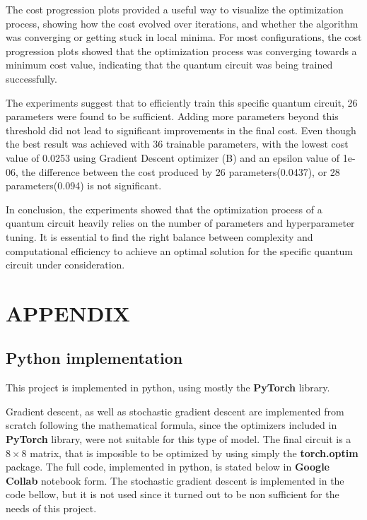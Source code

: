 \documentclass[inscr,ack,preface]{diphdthesis}
\begin{document}
The cost progression plots provided a useful way to visualize the optimization process, showing how the cost evolved over iterations, and whether the algorithm was converging or getting stuck in local minima. For most configurations, the cost progression plots showed that the optimization process was converging towards a minimum cost value, indicating that the quantum circuit was being trained successfully.

The experiments suggest that to efficiently train this specific quantum circuit, 26 parameters were found to be sufficient. Adding more parameters beyond this threshold did not lead to significant improvements in the final cost. Even though the best result was achieved with 36 trainable parameters, with the lowest cost value of 0.0253 using Gradient Descent optimizer (B) and an epsilon value of 1e-06, the difference between the cost produced by 26 parameters(0.0437), or 28 parameters(0.094) is not significant.

In conclusion, the experiments showed that the optimization process of a quantum circuit heavily relies on the number of parameters and hyperparameter tuning. It is essential to find the right balance between complexity and computational efficiency to achieve an optimal solution for the specific quantum circuit under consideration.

\chapter{APPENDIX}
\section{Python implementation}

This project is implemented in python, using mostly the \textbf{PyTorch} library. 

Gradient descent, as well as stochastic gradient descent are implemented from scratch following the mathematical formula, since the optimizers included in \textbf{PyTorch} library, were not suitable for this type of model. The final circuit is a $8\times8$ matrix, that is imposible to be optimized by using simply the \textbf{torch.optim} package. The full code, implemented in python, is stated below in \textbf{Google Collab} notebook form. The stochastic gradient descent is implemented in the code bellow, but it is not used since it turned out to be non sufficient for the needs of this project. \\ 
\end{document}
